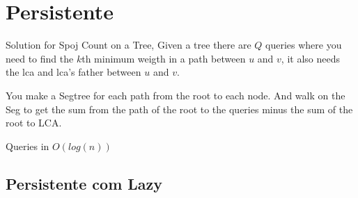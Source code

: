 \section{Persistente}


Solution for Spoj Count on a Tree,
Given a tree there are $Q$ queries where you need to find the $k$th minimum weigth in a path between $u$ and $v$, it also needs the lca and lca's father between $u$ and $v$.

You make a Segtree for each path from the root to each node. And walk on the Seg to get the sum from the path of the root to the queries minus the sum of the root to LCA.

Queries in $O(log(n))$


\subsection{Persistente com Lazy}

